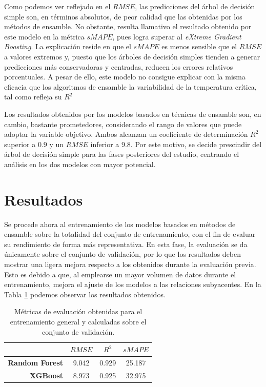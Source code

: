 \documentclass[titlepage, 11pt]{book}
\begin{document}
Como podemos ver reflejado en el $RMSE$, las predicciones del árbol de decisión simple son, en términos absolutos, de peor calidad que las obtenidas por los métodos de ensamble. No obstante, resulta llamativo el resultado obtenido por este modelo en la métrica $sMAPE$, pues logra superar al \textit{eXtreme Gradient Boosting}. La explicación reside en que el $sMAPE$ es menos sensible que el $RMSE$ a valores extremos y, puesto que los árboles de decisión simples tienden a generar predicciones más conservadoras y centradas, reducen los errores relativos porcentuales. A pesar de ello, este modelo no consigue explicar con la misma eficacia que los algoritmos de ensamble la variabilidad de la temperatura crítica, tal como refleja su $R^2$

Los resultados obtenidos por los modelos basados en técnicas de ensamble son, en cambio, bastante prometedores, considerando el rango de valores que puede adoptar la variable objetivo. Ambos alcanzan un coeficiente de determinación $R^2$ superior a $0.9$ y un $RMSE$ inferior a $9.8$. Por este motivo, se decide prescindir del árbol de decisión simple para las fases posteriores del estudio, centrando el análisis en los dos modelos con mayor potencial.

\section{Resultados}
Se procede ahora al entrenamiento de los modelos basados en métodos de ensamble sobre la totalidad del conjunto de entrenamiento, con el fin de evaluar su rendimiento de forma más representativa. En esta fase, la evaluación se da únicamente sobre el conjunto de validación, por lo que los resultados deben mostrar una ligera mejora respecto a los obtenidos durante la evaluación previa. Esto es debido a que, al emplearse un mayor volumen de datos durante el entrenamiento, mejora el ajuste de los modelos a las relaciones subyacentes. En la Tabla \ref{tab:res_train} podemos observar los resultados obtenidos.

\begin{table}[H]
    \centering
    \caption{Métricas de evaluación obtenidas para el entrenamiento general y calculadas sobre el conjunto de validación.}
    \begin{tabular}{r|c|c|c}
                               & \textbf{$RMSE$} & \textbf{$R^2$} & \textbf{$sMAPE$} \\ \hline
        \textbf{Random Forest} & 9.042           & 0.929          & 25.187           \\ \hline
        \textbf{XGBoost}       & 8.973           & 0.925          & 32.975
    \end{tabular}
    \label{tab:res_train}
\end{table}
\end{document}
